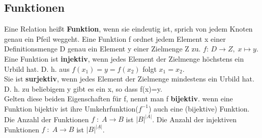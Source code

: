 \documentclass[11pt]{article}
\begin{document}
\subsection{Funktionen}
Eine Relation hei{\ss}t {\bfseries Funktion}, wenn sie eindeutig ist, sprich von jedem Knoten genau ein Pfeil weggeht. Eine Funktion f ordnet jedem Element x einer Definitionsmenge D genau ein Element y einer Zielmenge Z zu. $f\colon\, D\to Z,\; x\mapsto y.$\\
Eine Funktion ist {\bfseries injektiv}, wenn jedes Element der Zielmenge h{\"o}chstens ein Urbild hat. D. h. aus $f(x_1) = y = f(x_2)$ folgt $x_1=x_2$.\\
Sie ist {\bfseries surjektiv}, wenn jedes Element der Zielmenge mindestens ein Urbild hat. D. h. zu beliebigem y gibt es ein x, so dass f(x)=y.\\
Gelten diese beiden Eigenschaften f{\"u}r f, nennt man f {\bfseries bijektiv}. wenn eine Funktion bijektiv ist ihre Umkehrfunktion($f^{-1}$) auch eine (bijektive) Funktion.\\
Die Anzahl der Funktionen $f\; : \; A \rightarrow B$ ist $\mathopen| B \mathclose| ^{\mathopen| A \mathclose|}$. Die Anzahl der injektiven Funktionen $f\; : \; A \rightarrow B$ ist  $\mathopen| B \mathclose| ^{\mathopen| \underline{A} \mathclose|}$.
\end{document}
